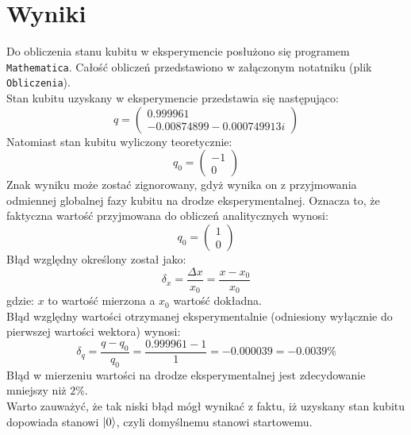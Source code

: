 \documentclass{article}
\begin{document}
\section{Wyniki}
Do obliczenia stanu kubitu w eksperymencie posłużono się programem \verb+Mathematica+. Całość obliczeń przedstawiono w załączonym notatniku (plik \verb+Obliczenia+).\\
Stan kubitu uzyskany w eksperymencie przedstawia się następująco:
$$ q=\left(\begin{matrix}0.999961 \\-0.00874899-0.000749913 i\end{matrix}\right)$$
Natomiast stan kubitu wyliczony teoretycznie:
$$q_0=\left(\begin{matrix}-1\\0\end{matrix}\right)$$
Znak wyniku może zostać zignorowany, gdyż wynika on z przyjmowania odmiennej globalnej fazy kubitu na drodze eksperymentalnej. Oznacza to, że faktyczna wartość przyjmowana do obliczeń analitycznych wynosi:
$$q_0=\left(\begin{matrix}1\\0\end{matrix}\right)$$
Błąd względny określony został jako: $$\delta_x=\frac{\Delta x}{x_0}=\frac{x-x_0}{x_0}$$ gdzie: $x$ to wartość mierzona a $x_0$ wartość dokładna.\\
Błąd względny wartości otrzymanej eksperymentalnie (odniesiony wyłącznie do pierwszej wartości wektora) wynosi:
$$\delta_q=\frac{q-q_0}{q_0}=\frac{0.999961-1}{1}=-0.000039=-0.0039\%$$
Błąd w mierzeniu wartości na drodze eksperymentalnej jest zdecydowanie mniejszy niż $2\%$.\\
Warto zauważyć, że tak niski błąd mógł wynikać z faktu, iż uzyskany stan kubitu dopowiada stanowi $\ket{0}$, czyli domyślnemu stanowi startowemu.
\end{document}
